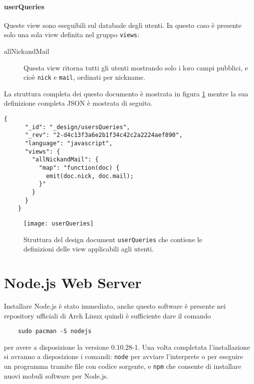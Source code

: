                \paragraph{userQueries} Queste view sono eseguibili sul
                databade degli utenti. In questo caso è presente solo una sola
                view definita nel gruppo \texttt{views}:
                \begin{description}
                    \item[allNickandMail] Questa view ritorna tutti gli utenti
                    mostrando solo i loro campi pubblici, e cioè \texttt{nick}
                    e \texttt{mail}, ordinati per nickname.
                \end{description}
                La struttura completa dei questo documento è mostrata in
                figura \ref{fig:userQueries} mentre la sua definizione completa
                JSON è mostrata di seguito.
                \begin{lstlisting}[language=plane]
    {
      "_id": "_design/usersQueries",
      "_rev": "2-d4c13f3a6e2b1f34c42c2a2224aef890",
      "language": "javascript",
      "views": {
        "allNickandMail": {
          "map": "function(doc) {
            emit(doc.nick, doc.mail);
          }"
        }
      }
    }
                \end{lstlisting}
                \begin{figure}[H]
                    \centering
                    \texttt{[image: userQueries]}
                    \caption{
                        Struttura del design document \texttt{userQueries} che
                        contiene le definizioni delle view applicabili agli
                        utenti.
                    }
                    \label{fig:userQueries}
                \end{figure}


    \section{Node.js Web Server}
        Installare Node.js è stato immediato, anche questo software è
        presente nei repository ufficiali di Arch Linux quindi è sufficiente
        dare il comando
        \begin{lstlisting}
    sudo pacman -S nodejs
        \end{lstlisting}
        per avere a disposizione la versione 0.10.28-1. Una volta completata
        l'installazione si avranno a disposizione i comandi: \texttt{node}
        per avviare l'interprete o per eseguire un programma tramite file con
        codice sorgente, e \texttt{npm} che consente di installare nuovi
        mobuli software per Node.js.
